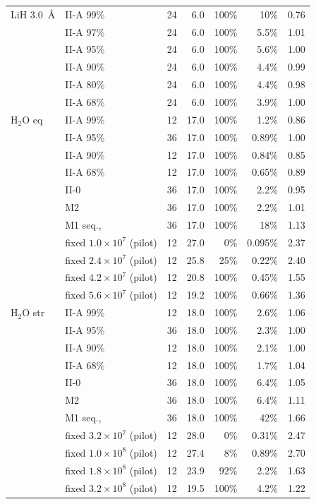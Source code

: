 \documentclass[11pt]{article}
\begin{document}
\begin{table}[!htb]
{\begin{tabular}{llrrrrr}
\midrule
LiH 3.0~\AA & II-A 99\% & 24 & 6.0 & 100\% & 10\% & 0.76 \\
 & II-A 97\% & 24 & 6.0 & 100\% & 5.5\% & 1.01 \\
 & II-A 95\% & 24 & 6.0 & 100\% & 5.6\% & 1.00 \\
 & II-A 90\% & 24 & 6.0 & 100\% & 4.4\% & 0.99 \\
 & II-A 80\% & 24 & 6.0 & 100\% & 4.4\% & 0.98 \\
 & II-A 68\% & 24 & 6.0 & 100\% & 3.9\% & 1.00 \\
\midrule
H$_2$O eq & II-A 99\% & 12 & 17.0 & 100\% & 1.2\% & 0.86 \\
 & II-A 95\% & 36 & 17.0 & 100\% & 0.89\% & 1.00 \\
 & II-A 90\% & 12 & 17.0 & 100\% & 0.84\% & 0.85 \\
 & II-A 68\% & 12 & 17.0 & 100\% & 0.65\% & 0.89 \\
 & II-0 & 36 & 17.0 & 100\% & 2.2\% & 0.95 \\
 & M2 & 36 & 17.0 & 100\% & 2.2\% & 1.01 \\
 & M1 seq., & 36 & 17.0 & 100\% & 18\% & 1.13 \\
 & fixed $1.0\times10^{7}$ (pilot) & 12 & 27.0 & 0\% & 0.095\% & 2.37 \\
 & fixed $2.4\times10^{7}$ (pilot) & 12 & 25.8 & 25\% & 0.22\% & 2.40 \\
 & fixed $4.2\times10^{7}$ (pilot) & 12 & 20.8 & 100\% & 0.45\% & 1.55 \\
 & fixed $5.6\times10^{7}$ (pilot) & 12 & 19.2 & 100\% & 0.66\% & 1.36 \\
\midrule
H$_2$O str & II-A 99\% & 12 & 18.0 & 100\% & 2.6\% & 1.06 \\
 & II-A 95\% & 36 & 18.0 & 100\% & 2.3\% & 1.00 \\
 & II-A 90\% & 12 & 18.0 & 100\% & 2.1\% & 1.00 \\
 & II-A 68\% & 12 & 18.0 & 100\% & 1.7\% & 1.04 \\
 & II-0 & 36 & 18.0 & 100\% & 6.4\% & 1.05 \\
 & M2 & 36 & 18.0 & 100\% & 6.4\% & 1.11 \\
 & M1 seq., & 36 & 18.0 & 100\% & 42\% & 1.66 \\
 & fixed $3.2\times10^{7}$ (pilot) & 12 & 28.0 & 0\% & 0.31\% & 2.47 \\
 & fixed $1.0\times10^{8}$ (pilot) & 12 & 27.4 & 8\% & 0.89\% & 2.70 \\
 & fixed $1.8\times10^{8}$ (pilot) & 12 & 23.9 & 92\% & 2.2\% & 1.63 \\
 & fixed $3.2\times10^{8}$ (pilot) & 12 & 19.5 & 100\% & 4.2\% & 1.22 \\
\bottomrule
\end{tabular}}
\end{table}
\end{document}
